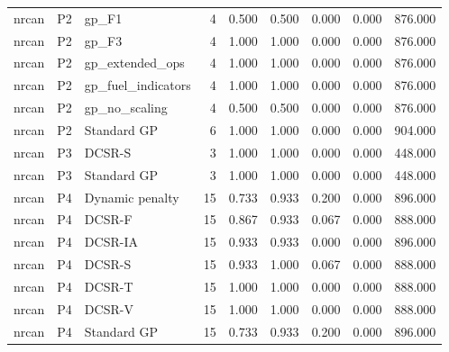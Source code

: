 \begin{tabular}{lllrrrrrr}
nrcan & P2 & gp\_F1 & 4 & 0.500 & 0.500 & 0.000 & 0.000 & 876.000 \\
nrcan & P2 & gp\_F3 & 4 & 1.000 & 1.000 & 0.000 & 0.000 & 876.000 \\
nrcan & P2 & gp\_extended\_ops & 4 & 1.000 & 1.000 & 0.000 & 0.000 & 876.000 \\
nrcan & P2 & gp\_fuel\_indicators & 4 & 1.000 & 1.000 & 0.000 & 0.000 & 876.000 \\
nrcan & P2 & gp\_no\_scaling & 4 & 0.500 & 0.500 & 0.000 & 0.000 & 876.000 \\
nrcan & P2 & Standard GP & 6 & 1.000 & 1.000 & 0.000 & 0.000 & 904.000 \\
nrcan & P3 & DCSR-S & 3 & 1.000 & 1.000 & 0.000 & 0.000 & 448.000 \\
nrcan & P3 & Standard GP & 3 & 1.000 & 1.000 & 0.000 & 0.000 & 448.000 \\
nrcan & P4 & Dynamic penalty & 15 & 0.733 & 0.933 & 0.200 & 0.000 & 896.000 \\
nrcan & P4 & DCSR-F & 15 & 0.867 & 0.933 & 0.067 & 0.000 & 888.000 \\
nrcan & P4 & DCSR-IA & 15 & 0.933 & 0.933 & 0.000 & 0.000 & 896.000 \\
nrcan & P4 & DCSR-S & 15 & 0.933 & 1.000 & 0.067 & 0.000 & 888.000 \\
nrcan & P4 & DCSR-T & 15 & 1.000 & 1.000 & 0.000 & 0.000 & 888.000 \\
nrcan & P4 & DCSR-V & 15 & 1.000 & 1.000 & 0.000 & 0.000 & 888.000 \\
nrcan & P4 & Standard GP & 15 & 0.733 & 0.933 & 0.200 & 0.000 & 896.000 \\
\bottomrule
\end{tabular}
